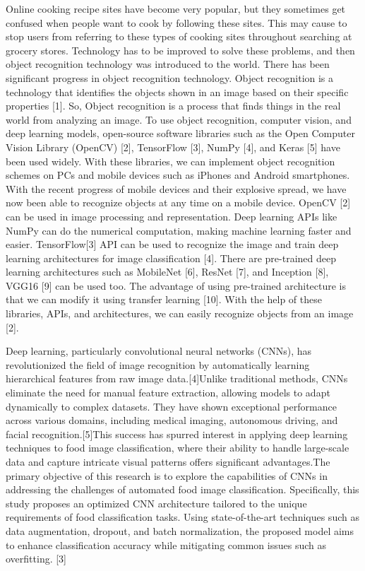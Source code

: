 \documentclass[12pt, a4paper]{article} %
\begin{document}
Online cooking recipe sites have become very popular, but they sometimes get confused when people want to cook by following these sites. This may cause to stop users from referring to these types of cooking sites throughout searching at grocery stores. Technology has to be improved to solve these problems, and then object recognition technology was introduced to the world. There has been significant progress in object recognition technology. Object recognition is a technology that identifies the objects shown in an image based on their specific properties [1]. So, Object recognition is a process that finds things in the real world from analyzing an image. To use object recognition, computer vision, and deep learning models, open-source software libraries such as the Open Computer Vision Library (OpenCV) [2], TensorFlow [3], NumPy [4], and Keras [5] have been used widely. With these libraries, we can implement object recognition schemes on PCs and mobile devices such as iPhones and Android smartphones. With the recent progress of mobile devices and their explosive spread, we have now been able to recognize objects at any time on a mobile device. OpenCV [2] can be used in image processing and representation. Deep learning APIs like NumPy can do the numerical computation, making machine learning faster and easier. TensorFlow[3] API can be used to recognize the image and train deep learning architectures for image classification [4]. There are pre-trained deep learning architectures such as MobileNet [6], ResNet [7], and Inception [8], VGG16 [9] can be used too. The advantage of using pre-trained architecture is that we can modify it using transfer learning [10]. With the help of these libraries, APIs, and architectures, we can easily recognize objects from an image [2].\vspace{1 cm}


Deep    learning,    particularly    convolutional    neural networks  (CNNs),  has  revolutionized  the  field  of  image recognition by automatically learning hierarchical  features from raw image data.[4]Unlike traditional methods, CNNs eliminate  the  need  for  manual feature  extraction, allowing models to  adapt  dynamically  to  complex  datasets.  They have   shown   exceptional   performance   across   various domains, including  medical  imaging, autonomous driving, and facial recognition.[5]This success has spurred interest in   applying   deep   learning   techniques   to   food   image classification, where their ability to handle large-scale data and   capture   intricate   visual   patterns   offers   significant advantages.The  primary  objective  of  this  research  is  to explore   the   capabilities   of   CNNs   in   addressing   the challenges    of    automated    food    image    classification. Specifically,   this   study   proposes   an   optimized   CNN architecture  tailored  to  the  unique  requirements  of  food classification     tasks.     Using state-of-the-art techniques such as data augmentation, dropout, and batch normalization, the proposed model aims to enhance classification accuracy while mitigating common issues such as overfitting. [3] \vspace{1 cm}
\end{document}
